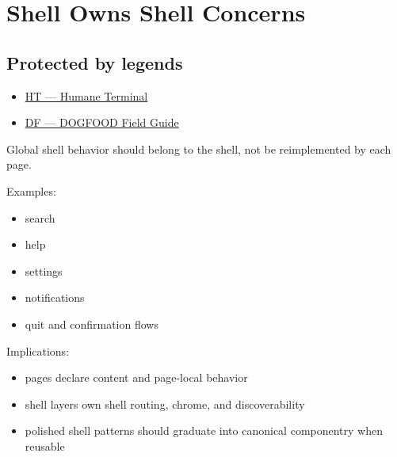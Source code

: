 \chapter{Shell Owns Shell Concerns}\label{record-058}

\smallskip

\section{Protected by legends}\label{record-058-protected-by-legends}

\begin{itemize}
\tightlist
\item
  \href{https://github.com/flyingrobots/bijou/blob/1853ad902f6bf219326409e7f743a5a1d6517dbc/docs/legends/HT-humane-terminal.md}{HT --- Humane Terminal}
\item
  \href{https://github.com/flyingrobots/bijou/blob/1853ad902f6bf219326409e7f743a5a1d6517dbc/docs/legends/DF-dogfood-field-guide.md}{DF --- DOGFOOD Field Guide}
\end{itemize}

Global shell behavior should belong to the shell, not be reimplemented by each page.

Examples:

\begin{itemize}
\tightlist
\item
  search
\item
  help
\item
  settings
\item
  notifications
\item
  quit and confirmation flows
\end{itemize}

Implications:

\begin{itemize}
\tightlist
\item
  pages declare content and page-local behavior
\item
  shell layers own shell routing, chrome, and discoverability
\item
  polished shell patterns should graduate into canonical componentry when reusable
\end{itemize}

